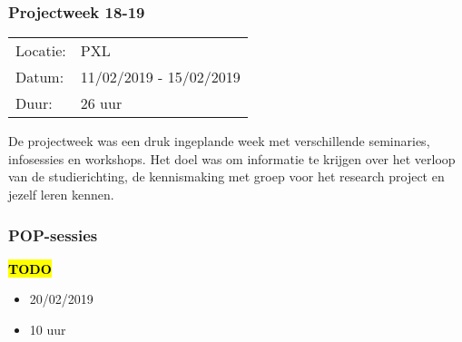 \subsubsection{Projectweek 18-19}

\begin{tabular}{l l}
  Locatie: & PXL\\
  Datum: & 11/02/2019 - 15/02/2019\\
  Duur: & 26 uur
\end{tabular}

De projectweek was een druk ingeplande week met verschillende seminaries, infosessies en workshops. Het doel was om informatie te krijgen over het verloop van de studierichting, de kennismaking met groep voor het research project en jezelf leren kennen.

\subsubsection{POP\hyp{}sessies}

\hl{\textbf{TODO}}

\begin{itemize}
  \item 20/02/2019
  \item 10 uur
\end{itemize}